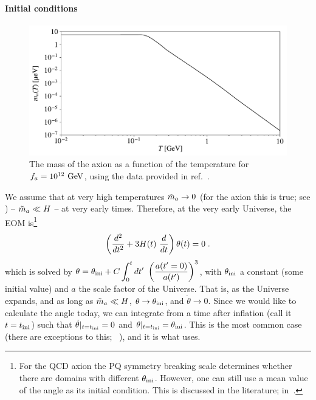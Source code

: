 \documentclass[11pt,a4paper]{article}
\begin{document}
\paragraph{Initial conditions}
%
\begin{figure}[h!]
	\includegraphics[width=1\textwidth]{figs/axion_mass.pdf}
	\caption{The mass of the axion as a function of the temperature for $f_{a}{}=10^{12}~{\rm GeV}$, using the data provided in ref.~\cite{Borsanyi:2016ksw}.}
	\label{fig:axion_mass}
\end{figure}
%
We assume that at very high temperatures $\tilde m_{a}{} \to 0$ (for the axion this is true; see ) -- \ie $\tilde m_{a}{} \ll H$ -- at very early times.  Therefore, at the very early Universe, the EOM is\footnote{For the QCD axion the PQ symmetry breaking scale determines whether there are domains with different $\theta_{\rm ini}{}$.  However, one can still use a mean value of the angle as its initial condition. This is discussed in the literature; \eg in~\cite{Preskill:1982cy,Visinelli:2009zm,Visinelli:2009kt}.}
%
\begin{equation}
	\lrb{\dfrac{d^2}{d t^2} + 3 H(t) \ \dfrac{d}{d t}  } \theta(t) = 0 \; .
	\label{eq:massless_eom}
\end{equation}
%
which is solved by $\theta = \theta_{\rm ini}{} + C \displaystyle \int_{0}^t d t' \ \left(  \dfrac{a(t'=0)}{a(t')}  \right)^3$, with $\theta_{\rm ini}{}$ a constant (some initial value) and $a$ the scale factor of the Universe. That is, as the Universe expands, and as long as $\tilde m_{a}{} \ll H$, $\theta \to \theta_{\rm ini}{}$, and $\dot \theta \to 0$. Since we would like to calculate the angle today, we can integrate  from a time after inflation (call it $t = t_{\rm ini}{}$) such that $ \dot \theta |_{t=t_{\rm ini}{}} = 0$ and  $\theta|_{t=t_{\rm ini}{}} = \theta_{\rm ini}{}$.   This is the most common case (there are exceptions to this; \eg~\cite{Co:2019jts}), and it is what \mimes uses.
\end{document}
